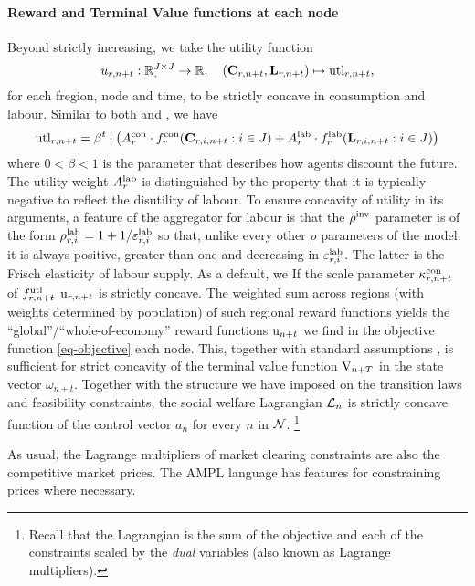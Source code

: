 \documentclass[12pt,a4paper,twoside, draft]{article}
\begin{document}
\paragraph{Reward and Terminal Value functions at each node}
Beyond strictly increasing, we take the utility function
\[
u_{r, n + t}: \nnreal^{J \times J} \rightarrow \R, \quad
  (\mathbf{C}_{r, n + t}, \mathbf{L}_{r, n + t})
    \mapsto \textup{utl}_{r, n + t},
\]
for each fregion, node and time,
to be strictly concave in consumption and labour.
Similar to both \citet{Atalay-Sectoral_shocks} and \citet{CJ}, we have
\begin{equation}
  \textup{utl}_{r, n + t}
    = \beta^{t}
      \cdot \left(
        A_{r}^\textup{con}
          \cdot f_{r}^{\textup{con}}(\mathbf{C}_{r, i, n + t}: i \in J)
        + A_{r}^{\textup{lab}}
          \cdot f_{r}^{{\textup{lab}}}(\mathbf{L}_{r, i, n + t}: i \in J)
      \right)
\end{equation}
where $0 < \beta < 1$ is the parameter that describes how agents discount
the future.
The utility weight $A_{r}^{{\textup{lab}}}$ is distinguished by the property that
it is typically negative to reflect the disutility of labour.
To ensure concavity of utility in its arguments, a
feature of the aggregator for labour is that the $\rho^{\textup{inv}}$ parameter
is of the form
$\rho_{r, i}^{{\textup{lab}}} = 1 + 1 / \varepsilon_{r, i}^{{\textup{lab}}}$
so that, unlike every other $\rho$ parameters of the model: it is always
positive, greater than one and decreasing in $\varepsilon_{r, i}^{\textup{lab}}$.
The latter is the Frisch elasticity of labour supply.
As a default, we If the scale parameter $\kappa_{r, n + t}^\textup{con}$ of 
$f_{r, n + t}^\textup{utl}$ $\textup{u}_{r, n + t}$ is strictly concave.
The weighted sum across regions (with weights determined by population) of such
regional reward functions yields the ``global''/``whole-of-economy'' reward
functions $\textup{u}_{n + t}$ we find in the objective function
\eqref{eq-objective} each node.
This, together with standard assumptions
\citep[Theorem 12.2.12]{Stachurski-Economic_dynamics}, is sufficient for strict
concavity of the terminal value function $\textup{V}_{n + T}$ in the state
vector $\omega_{n + t}$.
Together with the structure we have imposed on the transition laws and
feasibility constraints, the social welfare Lagrangian $\mathcal L_{n}$ is
strictly concave function of the control vector $a_{n}$ for every $n$ in
$\mathcal N$.
\footnote{
Recall that the Lagrangian is the sum of the objective and each of the
constraints scaled by the \emph{dual} variables (also known as Lagrange
multipliers).
}
\begin{remark*}
As usual, the Lagrange multipliers of market clearing constraints are also the
competitive market prices.
The AMPL language has features for constraining prices where necessary.
\end{remark*}
\end{document}
